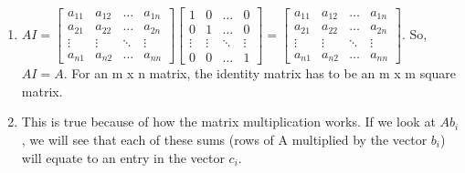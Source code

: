 \documentclass{article}
\begin{document}
\begin{enumerate}
	\item $AI = 
	\begin{bmatrix}
		a_{11}	&a_{12}	&\dots	&a_{1n}\\
		a_{21}	&a_{22}	&\dots	&a_{2n}\\
		\vdots	&\vdots	&\ddots	&\vdots\\
		a_{n1}	&a_{n2}	&\dots	&a_{nn}
	\end{bmatrix}
	\begin{bmatrix}
		1	&0	&\dots	&0\\
		0	&1	&\dots	&0\\
		\vdots	&\vdots	&\ddots	&\vdots\\
		0	&0	&\dots	&1	
	\end{bmatrix}
	= 
	\begin{bmatrix}
		a_{11}	&a_{12}	&\dots	&a_{1n}\\
		a_{21}	&a_{22}	&\dots	&a_{2n}\\
		\vdots	&\vdots	&\ddots	&\vdots\\
		a_{n1}	&a_{n2}	&\dots	&a_{nn}	
	\end{bmatrix}
	$. So, $AI = A$. For an m x n matrix, the identity matrix has to be an m x m square matrix.
	
	\item This is true because of how the matrix multiplication works. If we look at $Ab_i$, we will see that each of these sums (rows of A multiplied by the vector $b_i$) will equate to an entry in the vector $c_i$. 
	

\end{enumerate}
\end{document}
